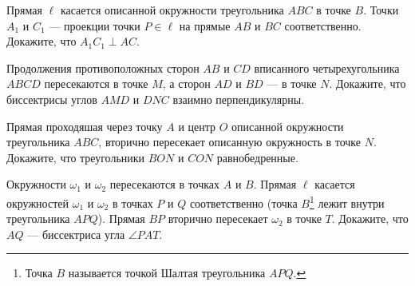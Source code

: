 \begin{tasks}
        \item Прямая $\ell$ касается описанной окружности треугольника $ABC$ в точке $B$. Точки $A_1$ и $C_1$ --- проекции точки $P \in \ell$ на прямые $AB$ и $BC$ соответственно. Докажите, что $A_1C_1 \perp AC$. 


    \item Продолжения противоположных сторон $AB$ и $CD$ вписанного четырехугольника $ABCD$ пересекаются в точке $M$, а сторон $AD$ и $BD$ --- в точке $N$. Докажите, что биссектрисы углов $AMD$ и $DNC$ взаимно перпендикулярны.

    \item Прямая проходяшая через точку $A$ и центр $O$ описанной окружности треугольника $ABC$, вторично пересекает описанную окружность в точке $N$. Докажите, что треугольники $BON$ и $CON$ равнобедренные.

    \moditem{*} Окружности $\omega_1$ и $\omega_2$ пересекаются в точках $A$ и $B$. Прямая $\ell$ касается окружностей $\omega_1$ и $\omega_2$ в точках $P$ и $Q$ соответственно (точка $B$\footnote{Точка $B$ называется точкой Шалтая треугольника $APQ$.} лежит внутри треугольника $APQ$). Прямая $BP$ вторично пересекает $\omega_2$ в точке $T$. Докажите, что $AQ$ --- биссектриса угла $\angle PAT$. 



\end{tasks}
